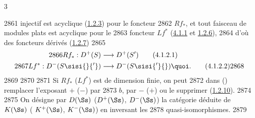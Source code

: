 3	\documentclass[10pt]{../fichiers-configuration-latex/smfart}
\begin{document}
  2861	injectif est acyclique (\hyperref[XVII.def1.2.3]{1.2.3}) pour le foncteur
  2862	$Rf_{\ast}$, et tout faisceau de modules plats est acyclique pour le
  2863	foncteur $Lf^{\ast}$ (\hyperref[XVII.prop4.1.1]{4.1.1} et \hyperref[XVII.prop1.2.6]{1.2.6}),
  2864	d'où des foncteurs dérivés (\hyperref[XVII.prop1.2.7]{1.2.7})
  2865	\begin{align*}
  2866	Rf_{\ast}:D^{+}(S) &\longrightarrow D^{+}(S')\tag{4.1.2.1}\\
  2867	Lf^{\ast}:D^{-}(S\sisi{}{'}) &\longrightarrow D^{-}(S\sisi{'}{}){\quoi}.\tag{4.1.2.2}
  2868	\end{align*}
  2869	%
  2870	
  2871	Si $Rf_{\ast}$ (\resp $Lf^{\ast}$) est de dimension finie, on peut
  2872	dans  (\resp {}) remplacer l'exposant $+$ (\resp $-$) par
  2873	$b$, par $-$ (\resp $+$) ou le supprimer (\hyperref[XVII.prop1.2.10]{1.2.10}).
  2874	
  2875	On désigne par $D(\Ss)$ (\resp $D^{+}(\Ss)$, 	$D^{-}(\Ss)$) la catégorie déduite de $K(\Ss)$ (	$K^{+}(\Ss)$, \resp $K^{-}(\Ss)$) en inversant les
  2878	quasi-isomorphismes.
  2879	
\end{document}
